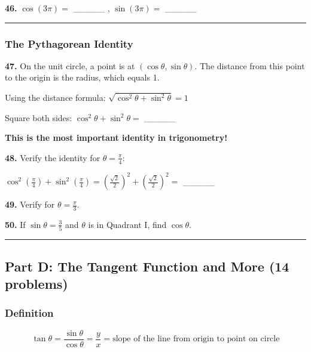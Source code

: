 \documentclass[
  11pt,
]{article}
\begin{document}
\textbf{46.} \(\cos(3\pi) ={}\) \_\_\_\_\_ , \(\sin(3\pi) ={}\)
\_\_\_\_\_

\begin{center}\rule{0.5\linewidth}{0.5pt}\end{center}

\hypertarget{the-pythagorean-identity}{%
\subsubsection{The Pythagorean
Identity}\label{the-pythagorean-identity}}

\textbf{47.} On the unit circle, a point is at
\((\cos\theta, \sin\theta)\). The distance from this point to the origin
is the radius, which equals 1.

Using the distance formula: \(\sqrt{\cos^2\theta + \sin^2\theta} = 1\)

Square both sides: \(\cos^2\theta + \sin^2\theta ={}\) \_\_\_\_\_

\textbf{This is the most important identity in trigonometry!}

\textbf{48.} Verify the identity for \(\theta = \frac{\pi}{4}\):

\(\cos^2\left(\frac{\pi}{4}\right) + \sin^2\left(\frac{\pi}{4}\right) = \left(\frac{\sqrt{2}}{2}\right)^2 + \left(\frac{\sqrt{2}}{2}\right)^2 ={}\)
\_\_\_\_\_

\textbf{49.} Verify for \(\theta = \frac{\pi}{3}\).

\textbf{50.} If \(\sin\theta = \frac{3}{5}\) and \(\theta\) is in
Quadrant I, find \(\cos\theta\).

\begin{center}\rule{0.5\linewidth}{0.5pt}\end{center}

\hypertarget{part-d-the-tangent-function-and-more-14-problems}{%
\subsection{Part D: The Tangent Function and More (14
problems)}\label{part-d-the-tangent-function-and-more-14-problems}}

\hypertarget{definition}{%
\subsubsection{Definition}\label{definition}}

\[\tan\theta = \frac{\sin\theta}{\cos\theta} = \frac{y}{x} = \text{slope of the line from origin to point on circle}\]
\end{document}
